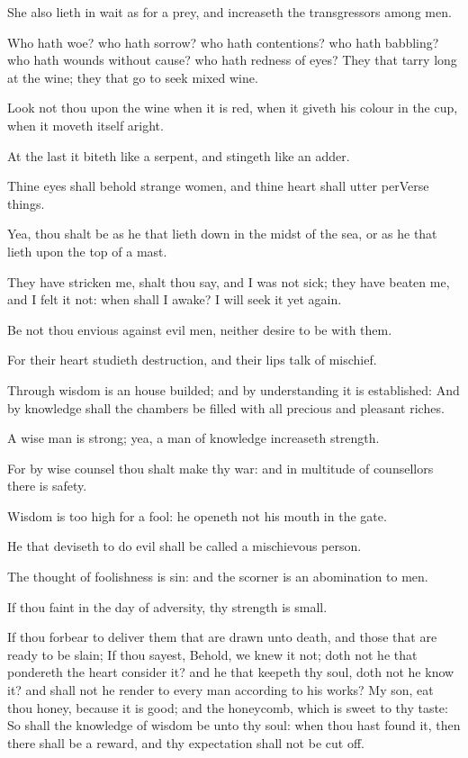 \Verse She also lieth in wait as for a prey, and increaseth the transgressors among men.

\Verse Who hath woe? who hath sorrow? who hath contentions? who hath babbling? who hath wounds without cause? who hath redness of eyes?  \Verse They that tarry long at the wine; they that go to seek mixed wine.

\Verse Look not thou upon the wine when it is red, when it giveth his colour in the cup, when it moveth itself aright.

\Verse At the last it biteth like a serpent, and stingeth like an adder.

\Verse Thine eyes shall behold strange women, and thine heart shall utter perVerse things.

\Verse Yea, thou shalt be as he that lieth down in the midst of the sea, or as he that lieth upon the top of a mast.

\Verse They have stricken me, shalt thou say, and I was not sick; they have beaten me, and I felt it not: when shall I awake? I will seek it yet again.


\Chapter
\Verse Be not thou envious against evil men, neither desire to be with them.

\Verse For their heart studieth destruction, and their lips talk of mischief.

\Verse Through wisdom is an house builded; and by understanding it is established: \Verse And by knowledge shall the chambers be filled with all precious and pleasant riches.

\Verse A wise man is strong; yea, a man of knowledge increaseth strength.

\Verse For by wise counsel thou shalt make thy war: and in multitude of counsellors there is safety.

\Verse Wisdom is too high for a fool: he openeth not his mouth in the gate.

\Verse He that deviseth to do evil shall be called a mischievous person.

\Verse The thought of foolishness is sin: and the scorner is an abomination to men.

\Verse If thou faint in the day of adversity, thy strength is small.

\Verse If thou forbear to deliver them that are drawn unto death, and those that are ready to be slain; \Verse If thou sayest, Behold, we knew it not; doth not he that pondereth the heart consider it? and he that keepeth thy soul, doth not he know it? and shall not he render to every man according to his works?  \Verse My son, eat thou honey, because it is good; and the honeycomb, which is sweet to thy taste: \Verse So shall the knowledge of wisdom be unto thy soul: when thou hast found it, then there shall be a reward, and thy expectation shall not be cut off.

